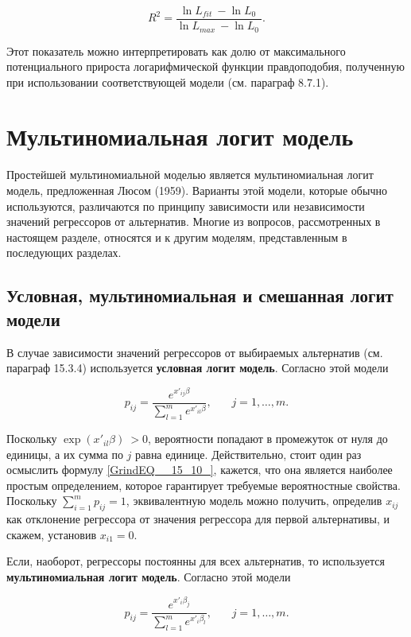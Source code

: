\[R^2=\frac{{\ln  L_{fit}\ }-{\ln  L_0\ }}{{\ln  L_{max}\ }-{\ln  L_0\ }}.\] 

Этот показатель можно интерпретировать как долю от максимального потенциального прироста логарифмической функции правдоподобия, полученную при использовании соответствующей модели (см. параграф 8.7.1).

\section{Мультиномиальная логит модель}

Простейшей мультиномиальной моделью является мультиномиальная логит модель, предложенная Люсом (1959). Варианты этой модели, которые обычно используются, различаются по принципу зависимости или независимости значений регрессоров от альтернатив. Многие из вопросов, рассмотренных в настоящем разделе, относятся и к другим моделям, представленным в последующих разделах.

\subsection{Условная, мультиномиальная и смешанная логит модели}

В случае зависимости значений регрессоров от выбираемых альтернатив (см. параграф 15.3.4) используется \textbf{условная логит модель}. Согласно этой модели

\begin{equation} \label{GrindEQ__15_10_} p_{ij}=\frac{e^{x'_{ij}\beta }}{\sum^m_{l=1}{e^{x'_{il}\beta }}},\ \ \ \ \ \ \ \ j=1,\dots ,m. \end{equation} 

Поскольку ${\exp  \left(x'_{il}\beta \right)\ }>0$, вероятности попадают в промежуток от нуля до единицы, а их сумма по $j$ равна единице. Действительно, стоит один раз осмыслить формулу \eqref{GrindEQ__15_10_}, кажется, что она является наиболее простым определением, которое гарантирует требуемые вероятностные свойства. Поскольку $\sum^m_{i=1}{p_{ij}}=1$, эквивалентную модель можно получить, определив $x_{ij}$ как отклонение регрессора от значения регрессора для первой альтернативы, и скажем, установив $x_{i1}=0.$

Если, наоборот, регрессоры постоянны для всех альтернатив, то используется \textbf{мультиномиальная логит модель}. Согласно этой модели

\begin{equation} \label{GrindEQ__15_11_} p_{ij}=\frac{e^{x'_i{\beta }_j}}{\sum^m_{l=1}{e^{x'_i{\beta }_l}}},\ \ \ \ \ \ \ \ j=1,\dots ,m. \end{equation} 

